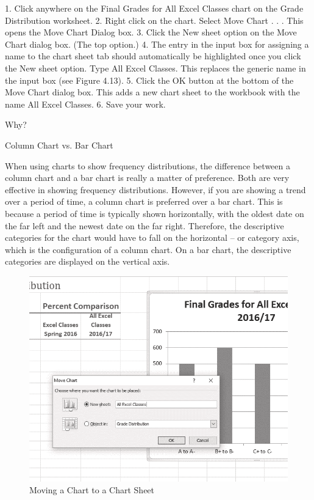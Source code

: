 1. Click anywhere on the Final Grades for All Excel Classes chart on the Grade Distribution
worksheet.
2. Right click on the chart. Select Move Chart . . . This opens the Move Chart Dialog box.
3. Click the New sheet option on the Move Chart dialog box. (The top option.)
4. The entry in the input box for assigning a name to the chart sheet tab should automatically be
highlighted once you click the New sheet option. Type All Excel Classes. This replaces the
generic name in the input box (see Figure 4.13).
5. Click the OK button at the bottom of the Move Chart dialog box. This adds a new chart sheet to
the workbook with the name All Excel Classes.
6. Save your work.




Why?

Column Chart vs. Bar Chart

When using charts to show frequency distributions, the difference between a column chart and a bar chart is
really a matter of preference. Both are very effective in showing frequency distributions. However, if you are
showing a trend over a period of time, a column chart is preferred over a bar chart. This is because a period of
time is typically shown horizontally, with the oldest date on the far left and the newest date on the far right.
Therefore, the descriptive categories for the chart would have to fall on the horizontal – or category axis, which is
the configuration of a column chart. On a bar chart, the descriptive categories are displayed on the vertical axis.


\begin{figure}[H]
	\centering
	\includegraphics[width=\maxwidth{.95\linewidth}]{gfx/ch04_fig14}
	\caption{Moving a Chart to a Chart Sheet}
	\label{04:fig14}
\end{figure}



